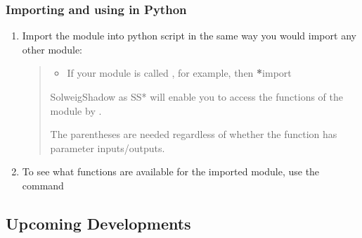 \documentclass[letterpaper,10pt,english]{sphinxmanual}
\begin{document}
\subsubsection{Importing and using in Python}
\label{\detokenize{DevelopmentGuidelines:importing-and-using-in-python}}\begin{enumerate}
\item {} 
Import the module into python script in the same way you would import
any other module:
\begin{quote}
\begin{itemize}
\item {} 
If your module is called , for example, then {\color{red}\bfseries{}*}import

\end{itemize}

SolweigShadow as SS* will enable you to access the functions of the
module by .

 The parentheses are needed regardless of whether the function
has parameter inputs/outputs.
\end{quote}

\item {} 
To see what functions are available for the imported module, use the
command

%
\begin{sphinxVerbatim}[commandchars=\\\{\}]
 
\end{sphinxVerbatim}

\end{enumerate}


\subsection{Upcoming Developments}
\label{\detokenize{DevelopmentGuidelines:upcoming-developments}}
\end{document}
